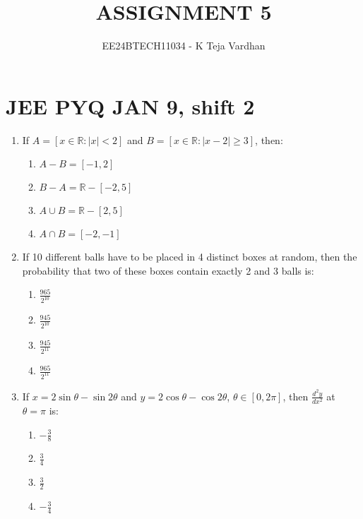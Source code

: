 \documentclass[journal]{IEEEtran}
\newcommand{\sbrak}[1]{\left[ #1 \right]}
\newcommand{\abs}[1]{\left| #1 \right|}
\begin{document}

\title{ASSIGNMENT 5}
\author{EE24BTECH11034 - K Teja Vardhan}
{\let\newpage\relax\maketitle}

\section{JEE PYQ JAN 9, shift 2}
\begin{enumerate}

    \item If $ A = \sbrak{ x \in \mathbb{R} : \abs{x} < 2 } $ and $ B = \sbrak{ x \in \mathbb{R} : \abs{x - 2} \geq 3 } $, then:
        \begin{multicols}{4}
        \begin{enumerate}
            \item $ A - B = \sbrak{ -1, 2 } $  
            \item $ B - A = \mathbb{R} - \sbrak{ -2, 5 } $  
            \item $ A \cup B = \mathbb{R} - \sbrak{ 2, 5 } $  
            \item $ A \cap B = \sbrak{ -2, -1 } $
        \end{enumerate}
        \end{multicols}

    \item If 10 different balls have to be placed in 4 distinct boxes at random, then the probability that two of these boxes contain exactly 2 and 3 balls is:
        \begin{multicols}{4}
        \begin{enumerate}
            \item $ \frac{965}{2^{10}} $  
            \item $ \frac{945}{2^{10}} $  
            \item $ \frac{945}{2^{11}} $  
            \item $ \frac{965}{2^{11}} $
        \end{enumerate}
        \end{multicols}

    \item If $ x = 2 \sin \theta - \sin 2 \theta $ and $ y = 2 \cos \theta - \cos 2 \theta $, $ \theta \in [0, 2\pi] $, then $ \frac{d^2y}{dx^2} $ at $ \theta = \pi $ is:
        \begin{multicols}{4}
        \begin{enumerate}
            \item $ -\frac{3}{8} $  
            \item $ \frac{3}{4} $  
            \item $ \frac{3}{2} $  
            \item $ -\frac{3}{4} $
        \end{enumerate}
        \end{multicols}


\end{enumerate}
\end{document}

